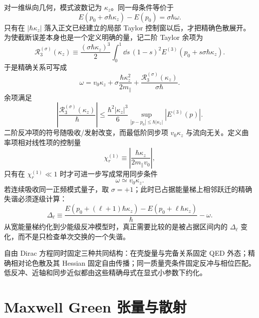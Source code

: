 对一维纵向几何，模式波数记为 $\kappa_z$。同一母条件等价于
\begin{equation}
 {E(p_0+\sigma\hbar \kappa_z)-E(p_0)=\sigma\hbar\omega.}
 \label{eq:exact-longitudinal-match}
\end{equation}
只有在 $|\hbar\kappa_z|$ 落入正文已经建立的局部 Taylor 控制窗以后，才把精确色散展开。为使截断误差本身也是一个定义明确的量，记二阶 Taylor 余项为
\begin{equation*}
 \mathcal R_3^{(\sigma)}(\kappa_z)
 \equiv
 \frac{(\sigma\hbar\kappa_z)^3}{2}
 \int_0^1\dd s\,(1-s)^2
 E^{(3)}\!\left(p_0+s\sigma\hbar\kappa_z\right).
\end{equation*}
于是精确关系可写成
\begin{equation}
 {
 \omega
 =v_0\kappa_z+\sigma\frac{\hbar \kappa_z^2}{2m_\parallel}
 +\frac{\mathcal R_3^{(\sigma)}(\kappa_z)}{\sigma\hbar}.}
 \label{eq:recoil-phase-match}
\end{equation}
余项满足
\begin{equation*}
 \left|
 \frac{\mathcal R_3^{(\sigma)}(\kappa_z)}{\hbar}
 \right|
 \le
 \frac{\hbar^2|\kappa_z|^3}{6}
 \sup_{|p-p_0|\le\hbar|\kappa_z|}|E^{(3)}(p)|.
\end{equation*}
二阶反冲项的符号随吸收/发射改变，而最低阶同步项 $v_0\kappa_z$ 与流向无关。定义曲率项相对线性项的控制量
\begin{equation*}
 \chi_r^{(1)}\equiv
 \left|\frac{\hbar \kappa_z}{2m_\parallel v_0}\right|,
\end{equation*}
只有在 $\chi_r^{(1)}\ll1$ 时才可进一步写成常用同步条件
\begin{equation}
 \omega\simeq v_0\kappa_z.
 \label{eq:linear-sync}
\end{equation}
若连续吸收同一正频模式量子，取 $\sigma=+1$；此时已占据能量梯上相邻跃迁的精确失谐必须逐级计算：
\begin{equation}
 {
 \Delta_\ell\equiv
 \frac{E(p_0+(\ell+1)\hbar \kappa_z)-E(p_0+\ell\hbar \kappa_z)}{\hbar}-\omega.}
 \label{eq:exact-ladder-detuning}
\end{equation}
从宽能量梯约化到少能级反冲模型时，真正需要比较的是被占据区间内的 $\Delta_\ell$ 变化，而不是只检查单次交换的一个失谐。

自由 Dirac 方程同时固定三种共同结构：在壳旋量与完备关系固定 QED 外态；精确相对论色散及其 Hessian 固定自由传播；同一质量壳条件固定反冲与相位匹配。低反冲、近轴和同步近似都由这些精确母式在显式小参数下约化。

\section{Maxwell Green 张量与散射}\label{sec:feqo-green}


